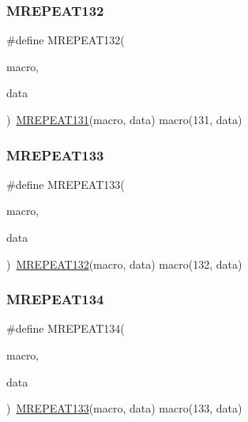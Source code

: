 \mbox{\label{group__group__sam0__utils__mrepeat_ga70b3e029b2ca5370d287a710ba66cba3}} 
\subsubsection{\texorpdfstring{MREPEAT132}{MREPEAT132}}
{\footnotesize\ttfamily \#define M\+R\+E\+P\+E\+A\+T132(\begin{DoxyParamCaption}\item[{}]{macro,  }\item[{}]{data }\end{DoxyParamCaption})~\mbox{\hyperlink{group__group__sam0__utils__mrepeat_ga6171f95e704d4bc6b92bca58bf15445c}{M\+R\+E\+P\+E\+A\+T131}}(macro, data)   macro(131, data)}

\mbox{\label{group__group__sam0__utils__mrepeat_ga808576086998ab3ae33981a5b7a28c4c}} 
\subsubsection{\texorpdfstring{MREPEAT133}{MREPEAT133}}
{\footnotesize\ttfamily \#define M\+R\+E\+P\+E\+A\+T133(\begin{DoxyParamCaption}\item[{}]{macro,  }\item[{}]{data }\end{DoxyParamCaption})~\mbox{\hyperlink{group__group__sam0__utils__mrepeat_ga70b3e029b2ca5370d287a710ba66cba3}{M\+R\+E\+P\+E\+A\+T132}}(macro, data)   macro(132, data)}

\mbox{\label{group__group__sam0__utils__mrepeat_gad697f86f8799147acde4ca488f87b446}} 
\subsubsection{\texorpdfstring{MREPEAT134}{MREPEAT134}}
{\footnotesize\ttfamily \#define M\+R\+E\+P\+E\+A\+T134(\begin{DoxyParamCaption}\item[{}]{macro,  }\item[{}]{data }\end{DoxyParamCaption})~\mbox{\hyperlink{group__group__sam0__utils__mrepeat_ga808576086998ab3ae33981a5b7a28c4c}{M\+R\+E\+P\+E\+A\+T133}}(macro, data)   macro(133, data)}

